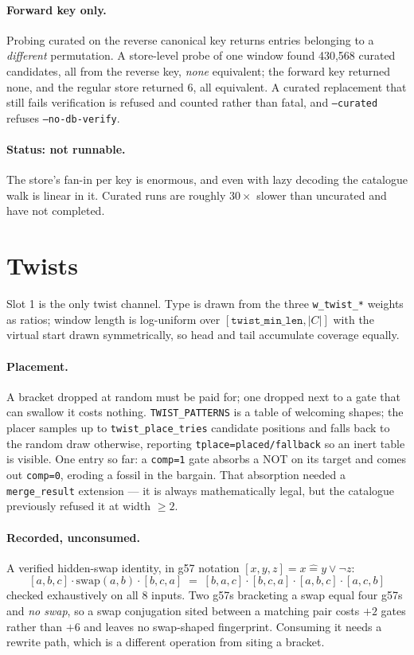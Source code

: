 \documentclass[11pt]{article}
\begin{document}
\paragraph{Forward key only.} Probing curated on the reverse canonical key
returns entries belonging to a \emph{different} permutation. A store-level probe
of one window found 430{,}568 curated candidates, all from the reverse key,
\emph{none} equivalent; the forward key returned none, and the regular store
returned 6, all equivalent. A curated replacement that still fails verification
is refused and counted rather than fatal, and \texttt{--curated} refuses
\texttt{--no-db-verify}.

\paragraph{Status: not runnable.} The store's fan-in per key is enormous, and
even with lazy decoding the catalogue walk is linear in it. Curated runs are
roughly $30\times$ slower than uncurated and have not completed.

\section{Twists}

Slot 1 is the only twist channel. Type is drawn from the three
\texttt{w_twist_*} weights as ratios; window length is log-uniform over
$[\texttt{twist_min_len}, |C|]$ with the virtual start drawn symmetrically, so
head and tail accumulate coverage equally.

\paragraph{Placement.} A bracket dropped at random must be paid for; one dropped
next to a gate that can swallow it costs nothing. \texttt{TWIST_PATTERNS} is a
table of welcoming shapes; the placer samples up to
\texttt{twist_place_tries} candidate positions and falls back to the random draw
otherwise, reporting \texttt{tplace=placed/fallback} so an inert table is
visible. One entry so far: a \texttt{comp=1} gate absorbs a NOT on its target and
comes out \texttt{comp=0}, eroding a fossil in the bargain. That absorption
needed a \texttt{merge_result} extension --- it is always mathematically legal,
but the catalogue previously refused it at width $\ge 2$.

\paragraph{Recorded, unconsumed.} A verified hidden-swap identity, in g57
notation $[x,y,z] = x \mathbin{\hat{=}} y \vee \neg z$:
\[
  [a,b,c]\cdot \mathrm{swap}(a,b)\cdot [b,c,a] \;=\; [b,a,c]\cdot[b,c,a]\cdot[a,b,c]\cdot[a,c,b]
\]
checked exhaustively on all 8 inputs. Two g57s bracketing a swap equal four g57s
and \emph{no swap}, so a swap conjugation sited between a matching pair costs
$+2$ gates rather than $+6$ and leaves no swap-shaped fingerprint. Consuming it
needs a rewrite path, which is a different operation from siting a bracket.
\end{document}
